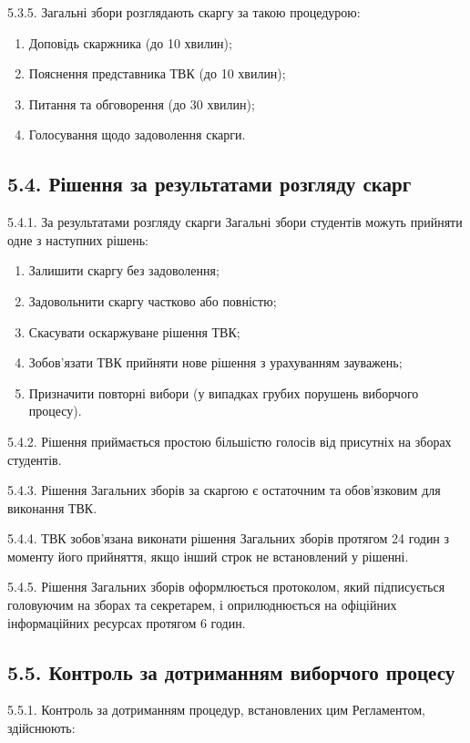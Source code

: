     5.3.5. Загальні збори розглядають скаргу за такою процедурою:

        \begin{enumerate}[label=\alph*)]
            \item Доповідь скаржника (до 10 хвилин);
            \item Пояснення представника ТВК (до 10 хвилин);
            \item Питання та обговорення (до 30 хвилин);
            \item Голосування щодо задоволення скарги.
        \end{enumerate}

\subsection*{5.4. Рішення за результатами розгляду скарг}
    5.4.1. За результатами розгляду скарги Загальні збори студентів можуть прийняти одне з наступних рішень:

        \begin{enumerate}[label=\alph*)]
            \item Залишити скаргу без задоволення;
            \item Задовольнити скаргу частково або повністю;
            \item Скасувати оскаржуване рішення ТВК;
            \item Зобов'язати ТВК прийняти нове рішення з урахуванням зауважень;
            \item Призначити повторні вибори (у випадках грубих порушень виборчого процесу).
        \end{enumerate}

    5.4.2. Рішення приймається простою більшістю голосів від присутніх на зборах студентів.

    5.4.3. Рішення Загальних зборів за скаргою є остаточним та обов'язковим для виконання ТВК.

    5.4.4. ТВК зобов'язана виконати рішення Загальних зборів протягом 24 годин з моменту його прийняття, якщо інший строк не встановлений у рішенні.

    5.4.5. Рішення Загальних зборів оформлюється протоколом, який підписується головуючим на зборах та секретарем, і оприлюднюється на офіційних інформаційних ресурсах протягом 6 годин.

\subsection*{5.5. Контроль за дотриманням виборчого процесу}
    5.5.1. Контроль за дотриманням процедур, встановлених цим Регламентом, здійснюють:

